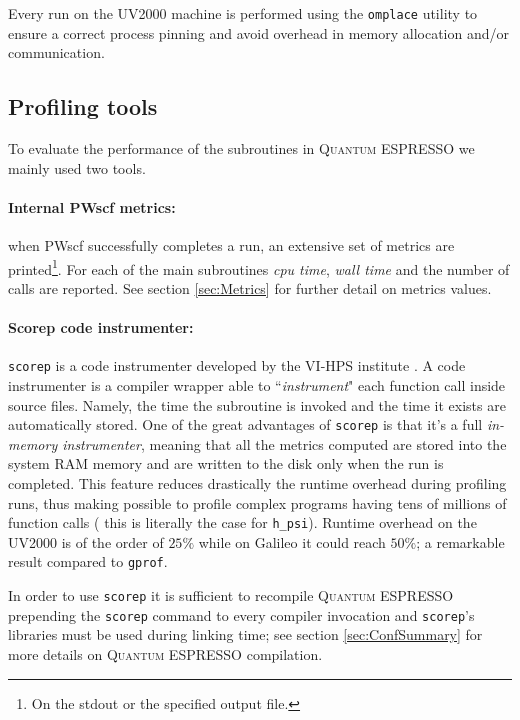 \documentclass[a4paper,12pt]{article}
\newcommand\QE{\textsc{Quantum} ESPRESSO }
\begin{document}
\begin{framed}
	Every run on the UV2000 machine is performed using the \texttt{omplace} utility to ensure a correct process pinning and avoid overhead in memory allocation and/or communication.
\end{framed}



\subsection{Profiling tools}\label{sec:profTools}

To evaluate the performance of the subroutines in \QE we mainly used two tools.

\paragraph{Internal PWscf metrics:} when PWscf successfully completes a run, an extensive set of metrics are printed\footnote{On the stdout or the specified output file.}. 
For each of the main subroutines  \textit{cpu time}, \textit{wall time} and the number of calls are reported.
See section \ref{sec:Metrics} for further detail on metrics values.

\paragraph{Scorep code instrumenter:} \texttt{scorep}\cite{SCOREPManual} is a code instrumenter developed by the VI-HPS institute \cite{VH}. 
A code instrumenter is a compiler wrapper able to ``\textit{instrument}" each function call inside source files.
Namely, the time the subroutine is invoked and the time it exists are automatically stored.
One of the great advantages of \texttt{scorep} is that it's a full \textit{in-memory instrumenter}, meaning that all the metrics computed are stored into the system RAM memory and are written to the disk only when the run is completed.
This feature reduces drastically the runtime overhead during profiling runs, thus making possible to profile complex programs having tens of millions of function calls ( this is literally the case for \texttt{h\_psi}).
Runtime overhead on the UV2000 is of the order of $25\%$ while on Galileo it could reach $50\%$; a remarkable result compared to \texttt{gprof}.

In order to use \texttt{scorep} it is sufficient to recompile \QE prepending the \texttt{scorep} command to every compiler invocation and  \texttt{scorep}'s libraries must be used during linking time; see section \ref{sec:ConfSummary} for more details on \QE compilation.
\end{document}
